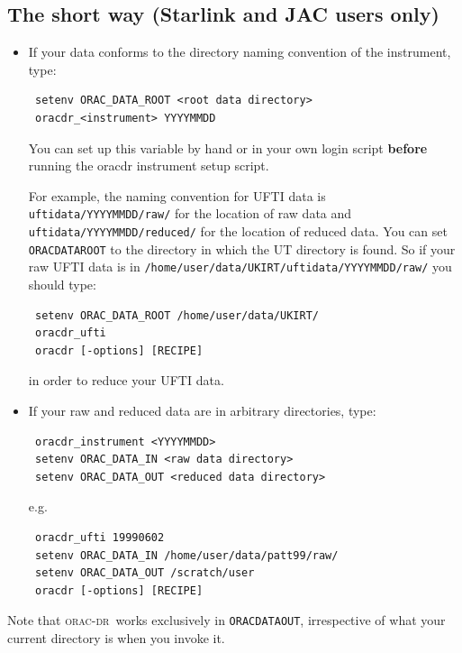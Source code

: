 \documentclass[twoside,11pt]{article}
\renewcommand{\_}{\texttt{\symbol{95}}}
\newcommand{\oracdr}{\textsc{orac-dr}}
\begin{document}
\subsection*{The short way (Starlink and JAC users only)\label{Setting_up_to_run_oracdr_The_short_way_Starlink_and_JAC_users_only_}}
\begin{itemize}
\item 

If your data conforms to the directory naming convention of the
instrument, type:

\begin{verbatim}
 setenv ORAC_DATA_ROOT <root data directory>
 oracdr_<instrument> YYYYMMDD
\end{verbatim}


You can set up this variable by hand or in your own login script
\textbf{before} running the oracdr instrument setup script.



For example, the naming convention for UFTI data is
\texttt{ufti\_data/YYYYMMDD/raw/} for the location of raw data and
\texttt{ufti\_data/YYYYMMDD/reduced/} for the location of reduced data. You can
set \texttt{ORAC\_DATA\_ROOT} to the directory in which the UT directory is
found. So if your raw UFTI data is in
\texttt{/home/user/data/UKIRT/ufti\_data/YYYYMMDD/raw/} you should type:

\begin{verbatim}
 setenv ORAC_DATA_ROOT /home/user/data/UKIRT/
 oracdr_ufti
 oracdr [-options] [RECIPE]
\end{verbatim}


in order to reduce your UFTI data.

\item 

If your raw and reduced data are in arbitrary directories, type:

\begin{verbatim}
 oracdr_instrument <YYYYMMDD>
 setenv ORAC_DATA_IN <raw data directory>
 setenv ORAC_DATA_OUT <reduced data directory>
\end{verbatim}


e.g.

\begin{verbatim}
 oracdr_ufti 19990602
 setenv ORAC_DATA_IN /home/user/data/patt99/raw/
 setenv ORAC_DATA_OUT /scratch/user
 oracdr [-options] [RECIPE]
\end{verbatim}
\end{itemize}


Note that \oracdr\ works exclusively in \texttt{ORAC\_DATA\_OUT}, irrespective of
what your current directory is when you invoke it.
\end{document}
